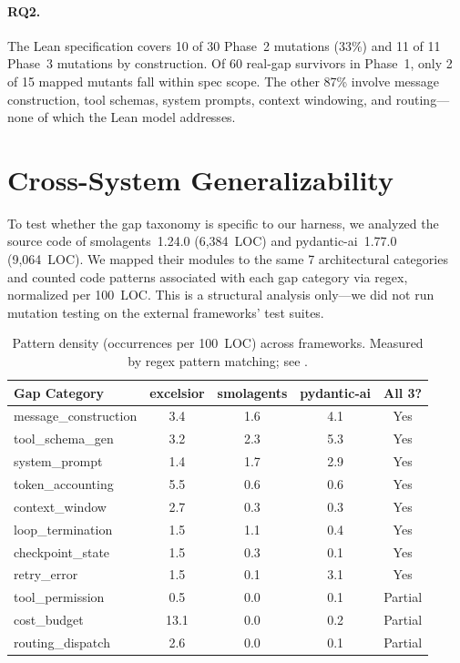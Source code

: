 \documentclass[11pt,a4paper]{article}
\begin{document}
\paragraph{RQ2.}
The Lean specification covers 10 of 30 Phase~2 mutations (33\%)
and 11 of 11 Phase~3 mutations by construction. Of 60 real-gap
survivors in Phase~1, only 2 of 15 mapped mutants fall within spec
scope. The other 87\% involve message construction, tool schemas,
system prompts, context windowing, and routing---none of which the
Lean model addresses.

\section{Cross-System Generalizability}
\label{sec:crosssystem}

To test whether the gap taxonomy is specific to our harness, we
analyzed the source code of smolagents~1.24.0 (6,384~LOC) and
pydantic-ai~1.77.0 (9,064~LOC). We mapped their modules to the same
7 architectural categories and counted code patterns associated with
each gap category via regex, normalized per 100~LOC. This is a
structural analysis only---we did not run mutation testing on the
external frameworks' test suites.

\begin{table}[htbp]
\centering
\caption{Pattern density (occurrences per 100~LOC) across frameworks.
Measured by regex pattern matching; see .}
\label{tab:crosssystem}
\small
\begin{tabular}{@{}lcccc@{}}
\toprule
\textbf{Gap Category} & \textbf{excelsior} & \textbf{smolagents} & \textbf{pydantic-ai} & \textbf{All 3?} \\
\midrule
message\_construction & 3.4 & 1.6 & 4.1 & Yes \\
tool\_schema\_gen & 3.2 & 2.3 & 5.3 & Yes \\
system\_prompt & 1.4 & 1.7 & 2.9 & Yes \\
token\_accounting & 5.5 & 0.6 & 0.6 & Yes \\
context\_window & 2.7 & 0.3 & 0.3 & Yes \\
loop\_termination & 1.5 & 1.1 & 0.4 & Yes \\
checkpoint\_state & 1.5 & 0.3 & 0.1 & Yes \\
retry\_error & 1.5 & 0.1 & 3.1 & Yes \\
\midrule
tool\_permission & 0.5 & 0.0 & 0.1 & Partial \\
cost\_budget & 13.1 & 0.0 & 0.2 & Partial \\
routing\_dispatch & 2.6 & 0.0 & 0.1 & Partial \\
\bottomrule
\end{tabular}
\end{table}
\end{document}

